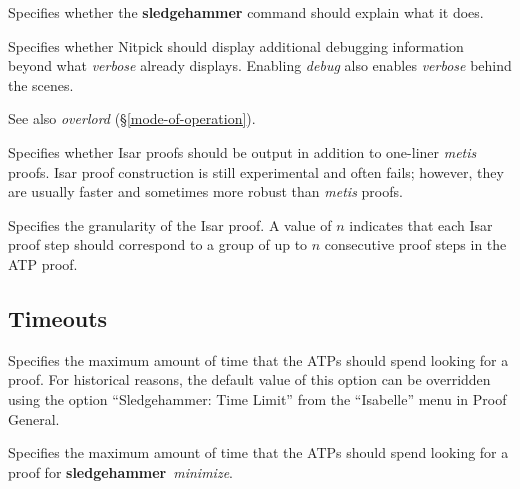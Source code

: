 \documentclass[a4paper,12pt]{article}
\begin{document}
\begin{enum}

Specifies whether the \textbf{sledgehammer} command should explain what it does.

Specifies whether Nitpick should display additional debugging information beyond
what \textit{verbose} already displays. Enabling \textit{debug} also enables
\textit{verbose} behind the scenes.

\nopagebreak
{\small See also \textit{overlord} (\S\ref{mode-of-operation}).}

Specifies whether Isar proofs should be output in addition to one-liner
\textit{metis} proofs. Isar proof construction is still experimental and often
fails; however, they are usually faster and sometimes more robust than
\textit{metis} proofs.

Specifies the granularity of the Isar proof. A value of $n$ indicates that each
Isar proof step should correspond to a group of up to $n$ consecutive proof
steps in the ATP proof.

\end{enum}

\subsection{Timeouts}
\label{timeouts}

\begin{enum}
Specifies the maximum amount of time that the ATPs should spend looking for a
proof. For historical reasons, the default value of this option can be
overridden using the option ``Sledgehammer: Time Limit'' from the ``Isabelle''
menu in Proof General.

Specifies the maximum amount of time that the ATPs should spend looking for a
proof for \textbf{sledgehammer}~\textit{minimize}.
\end{enum}

\let\em=\sl
{}

\end{document}

